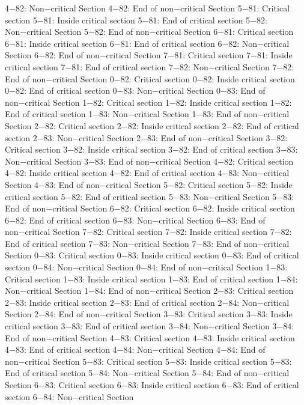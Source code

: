 4−82: Non−critical Section
4−82: End of non−critical Section
5−81: Critical section
5−81: Inside critical section
5−81: End of critical section
5−82: Non−critical Section
5−82: End of non−critical Section
6−81: Critical section
6−81: Inside critical section
6−81: End of critical section
6−82: Non−critical Section
6−82: End of non−critical Section
7−81: Critical section
7−81: Inside critical section
7−81: End of critical section
7−82: Non−critical Section
7−82: End of non−critical Section
0−82: Critical section
0−82: Inside critical section
0−82: End of critical section
0−83: Non−critical Section
0−83: End of non−critical Section
1−82: Critical section
1−82: Inside critical section
1−82: End of critical section
1−83: Non−critical Section
1−83: End of non−critical Section
2−82: Critical section
2−82: Inside critical section
2−82: End of critical section
2−83: Non−critical Section
2−83: End of non−critical Section
3−82: Critical section
3−82: Inside critical section
3−82: End of critical section
3−83: Non−critical Section
3−83: End of non−critical Section
4−82: Critical section
4−82: Inside critical section
4−82: End of critical section
4−83: Non−critical Section
4−83: End of non−critical Section
5−82: Critical section
5−82: Inside critical section
5−82: End of critical section
5−83: Non−critical Section
5−83: End of non−critical Section
6−82: Critical section
6−82: Inside critical section
6−82: End of critical section
6−83: Non−critical Section
6−83: End of non−critical Section
7−82: Critical section
7−82: Inside critical section
7−82: End of critical section
7−83: Non−critical Section
7−83: End of non−critical Section
0−83: Critical section
0−83: Inside critical section
0−83: End of critical section
0−84: Non−critical Section
0−84: End of non−critical Section
1−83: Critical section
1−83: Inside critical section
1−83: End of critical section
1−84: Non−critical Section
1−84: End of non−critical Section
2−83: Critical section
2−83: Inside critical section
2−83: End of critical section
2−84: Non−critical Section
2−84: End of non−critical Section
3−83: Critical section
3−83: Inside critical section
3−83: End of critical section
3−84: Non−critical Section
3−84: End of non−critical Section
4−83: Critical section
4−83: Inside critical section
4−83: End of critical section
4−84: Non−critical Section
4−84: End of non−critical Section
5−83: Critical section
5−83: Inside critical section
5−83: End of critical section
5−84: Non−critical Section
5−84: End of non−critical Section
6−83: Critical section
6−83: Inside critical section
6−83: End of critical section
6−84: Non−critical Section
